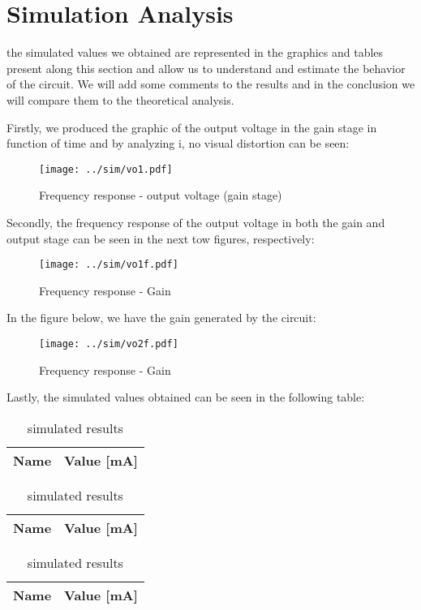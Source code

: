 \section{Simulation Analysis}
\label{sec:simulation}
the simulated values we obtained are represented in the graphics and tables present along this section and allow us to understand and estimate the behavior of the circuit. We will add some comments to the results and in the conclusion we will compare them to the theoretical analysis.

Firstly, we produced the graphic of the output voltage in the gain stage in function of time and by analyzing i, no visual distortion can be seen:
\begin{figure}[H] \centering
	\texttt{[image: ../sim/vo1.pdf]}
	\caption{Frequency response - output voltage (gain stage)}
	\label{fig:rc4}
\end{figure}

Secondly, the frequency response of the output voltage in both the gain and output stage can be seen in the next tow figures, respectively:
\begin{figure}[H] \centering
	\texttt{[image: ../sim/vo1f.pdf]}
	\caption{Frequency response - Gain}
	\label{fig:rc4}
\end{figure}

In the figure below, we have the gain generated by the circuit:
\begin{figure}[H] \centering
	\texttt{[image: ../sim/vo2f.pdf]}
	\caption{Frequency response - Gain}
	\label{fig:rc4}
\end{figure}

Lastly, the simulated values obtained can be seen in the following table:
\begin{table}[H]
	\centering
	\begin{tabular}{|l|r|}
		\hline    
		{\bf Name} & {\bf Value [mA]} \\ \hline
		
	\end{tabular}
	\caption{simulated results}
	\label{tab:op}
\end{table}

\begin{table}[H]
	\centering
	\begin{tabular}{|l|r|}
		\hline    
		{\bf Name} & {\bf Value [mA]} \\ \hline
		
	\end{tabular}
	\caption{simulated results}
	\label{tab:op}
\end{table}

\begin{table}[H]
	\centering
	\begin{tabular}{|l|r|}
		\hline    
		{\bf Name} & {\bf Value [mA]} \\ \hline
		
	\end{tabular}
	\caption{simulated results}
	\label{tab:op}
\end{table}
